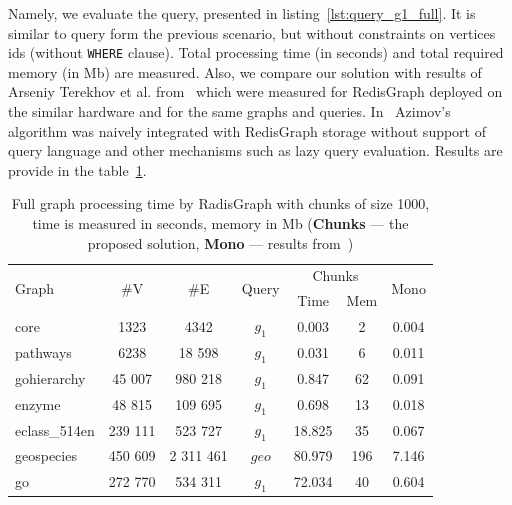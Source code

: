 Namely, we evaluate the query, presented in listing~\ref{lst:query_g1_full}. 
It is similar to query form the previous scenario, but without constraints on vertices ids (without \texttt{WHERE} clause).
Total processing time (in seconds) and total required memory (in Mb) are measured.
Also, we compare our solution with results of Arseniy Terekhov et al. from~\cite{10.1145/3398682.3399163} which were measured for RedisGraph deployed on the similar hardware and for the same graphs and queries.
In~\cite{10.1145/3398682.3399163} Azimov's algorithm was naively integrated with RedisGraph storage without support of query language and other mechanisms such as lazy query evaluation.
Results are provide in the table~\ref{tbl:redis_full_graph_processing}.

{\setlength{\tabcolsep}{0.25em}
\begin{table}
{
\caption{Full graph processing time by RadisGraph with chunks of size 1000, time is measured in seconds, memory in Mb (\textbf{Chunks} --- the proposed solution, \textbf{Mono} --- results from~\cite{10.1145/3398682.3399163})}
\label{tbl:redis_full_graph_processing}
\small
{}
\begin{tabular}{|l|c|c|c|c|c|c|}
\hline
\multirow{2}{*}{Graph} & \multirow{2}{*}{\#V} & \multirow{2}{*}{\#E} & \multirow{2}{*}{Query} & \multicolumn{2}{c|}{Chunks}  &  \multirow{2}{*}{Mono}  \\
                       &                      &                      &                        & Time   & Mem & \\
\hline
\hline
core                   & 1323                 & 4342                 & $g_1$                  & 0.003  & 2                  &  0.004 \\ 
pathways               & 6238                 & 18 598               & $g_1$                  & 0.031  & 6                  &  0.011 \\ 
gohierarchy            & 45 007               & 980 218              & $g_1$                  & 0.847  & 62                  &  0.091 \\ 
enzyme                 & 48 815               & 109 695              & $g_1$                  & 0.698  & 13                  &  0.018 \\ 
eclass\_514en          & 239 111              & 523 727              & $g_1$                  & 18.825 & 35                   &  0.067 \\ 
geospecies             & 450 609              & 2 311 461            & $geo$                  & 80.979 & 196                  &  7.146 \\
go                     & 272 770              & 534 311              & $g_1$                  & 72.034 & 40                  &  0.604 \\ 
\hline
\end{tabular}
}
\end{table}
}

